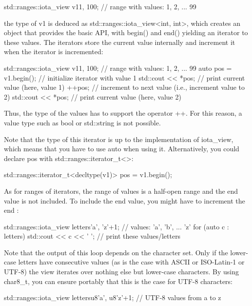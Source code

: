 \begin{cpp}
std::ranges::iota_view v1{1, 100}; // range with values: 1, 2, ... 99
\end{cpp}

the type of v1 is deduced as std::ranges::iota\_view<int, int>, which creates an object that provides the basic API, with begin() and end() yielding an iterator to these values. The iterators store the current value internally and increment it when the iterator is incremented:

\begin{cpp}
std::ranges::iota_view v1{1, 100}; // range with values: 1, 2, ... 99
auto pos = v1.begin(); // initialize iterator with value 1
std::cout << *pos; // print current value (here, value 1)
++pos; // increment to next value (i.e., increment value to 2)
std::cout << *pos; // print current value (here, value 2)
\end{cpp}

Thus, the type of the values has to support the operator ++. For this reason, a value type such as bool or std::string is not possible.

Note that the type of this iterator is up to the implementation of iota\_view, which means that you have to use auto when using it. Alternatively, you could declare pos with std::ranges::iterator\_t<>:

\begin{cpp}
std::ranges::iterator_t<decltype(v1)> pos = v1.begin();
\end{cpp}

As for ranges of iterators, the range of values is a half-open range and the end value is not included. To include the end value, you might have to increment the end :

\begin{cpp}
std::ranges::iota_view letters{'a', 'z'+1}; // values: ’a’, ’b’, ... ’z’
for (auto c : letters) {
	std::cout << c << ' '; // print these values/letters
}
\end{cpp}

Note that the output of this loop depends on the character set. Only if the lower-case letters have consecutive values (as is the case with ASCII or ISO-Latin-1 or UTF-8) the view iterates over nothing else but lower-case characters. By using char8\_t, you can ensure portably that this is the case for UTF-8 characters:

\begin{cpp}
std::ranges::iota_view letters{u8'a', u8'z'+1}; // UTF-8 values from a to z
\end{cpp}

